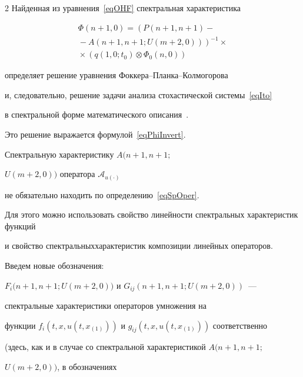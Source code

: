 \begin{multicols}{2}
Найденная из уравнения~\eqref{eqOHF} спектральная характеристика


\begin{multline}


  \Phi(n+1,0) = \left( P(n+1,n+1) -{}\right.\\


\left.  {}- A(n+1,n+1; U(m+2,0)) \right)^{-1} \times{}\\


{}\times 


  \left( q(1,0;t_0) \otimes \Phi_0(n,0) \right)


  \label{eqOHFSol}


\end{multline}


определяет решение уравнения Фок\-ке\-ра--План\-ка--Кол\-мо\-го\-ро\-ва 


и, следовательно, решение задачи анализа стохастической системы~\eqref{eqIto} 


в спектральной форме математического описания~\cite{PanRybSot, PanRyb}. 


Это решение выражается формулой~\eqref{eqPhiInvert}.





Спектральную характеристику $A(n+1,n+1;$\linebreak 


$ U(m+2,0))$ оператора $\mathcal{A}_{u(\cdot)}$ 


не обязательно на\-ходить по определению~\eqref{eqSpOper}. 


Для этого можно ис\-пользовать свойство линейности спект\-раль\-ных ха\-рактеристик функций 


и свойство спектральных\linebreak характеристик композиции линейных операторов. 


Введем новые обозначения:


$F_i(n+1,n+1;$\linebreak $U(m+2,0))$ и $G_{ij}(n+1,n+1; U(m+2,0))$~--- 


спект\-раль\-ные характеристики операторов умножения на 


функции $f_i(t,x,u(t,x_{(1)}))$ и $g_{ij}(t,x,u(t,x_{(1)}))$ соответственно 


(здесь, как и в случае со спект\-раль\-ной характеристикой $A(n+1,n+1;$\linebreak


$ U(m+2,0))$, в обозначениях 



\end{multicols}
